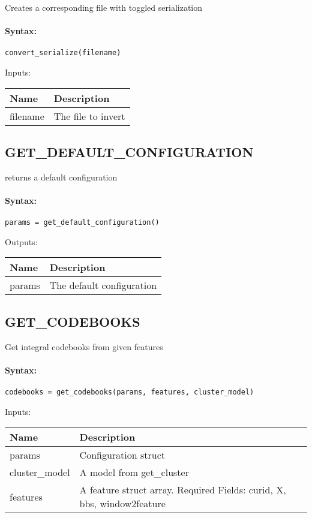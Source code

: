 Creates a corresponding file with toggled serialization

\paragraph{Syntax:} \verb|convert_serialize(filename)|

\bigskip
Inputs:

\begin{tabular}{|p{}|p{}|}
\hline
\textbf{Name} & \textbf{Description} \\
\hline \hline
filename & The file to invert  \\ \hline
\end{tabular}


\subsection{GET\_DEFAULT\_CONFIGURATION}

returns a default configuration

\paragraph{Syntax:} \verb|params = get_default_configuration()|

\bigskip
Outputs:

\begin{tabular}{|p{}|p{}|}
\hline
\textbf{Name} & \textbf{Description} \\
\hline \hline
params & The default configuration  \\ \hline
\end{tabular}

\subsection{GET\_CODEBOOKS}

Get integral codebooks from given features

\paragraph{Syntax:} \verb|codebooks = get_codebooks(params, features, cluster_model)|

\bigskip
Inputs:

\begin{tabular}{|p{}|p{}|}
\hline
\textbf{Name} & \textbf{Description} \\
\hline \hline
params & Configuration struct  \\ \hline
cluster\_model & A model from get\_cluster  \\ \hline
features & A feature struct array. Required Fields: curid, X, bbs, window2feature  \\ \hline
\end{tabular}

